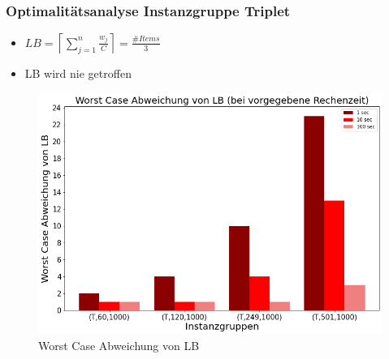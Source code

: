 \documentclass{beamer}
\begin{document}
\begin{frame}

\frametitle{Optimalitätsanalyse Instanzgruppe Triplet}
\begin{footnotesize}
\begin{itemize}
\item $LB = \left\lceil\sum_{j=1}^{n} \frac{w_j}{C}\right\rceil = \frac{\#Items}{3} $
\item LB wird nie getroffen
\end{itemize}

\end{footnotesize}


\begin{figure}[!htbp]
\begin{center}
\includegraphics[scale=0.3]{img/wc_trip.png}
\end{center}
\caption{Worst Case Abweichung von LB}
\label{fig:architecture}
\end{figure}



\end{frame}
\end{document}
